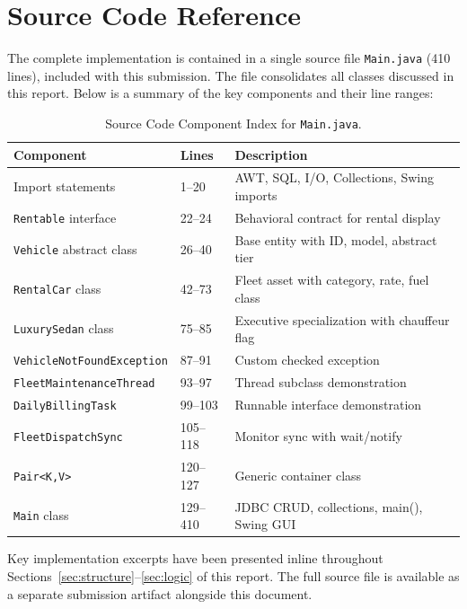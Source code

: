 \documentclass[11pt,a4paper]{article}
\begin{document}
\section{Source Code Reference}
\label{sec:appendix_code}

The complete implementation is contained in a single source file \texttt{Main.java} (410 lines), included with this submission. The file consolidates all classes discussed in this report. Below is a summary of the key components and their line ranges:

\begin{table}[h!]
\centering
\small
\begin{tabularx}{\textwidth}{l l p{6.5cm}}
\toprule
\textbf{Component} & \textbf{Lines} & \textbf{Description} \\
\midrule
Import statements & 1--20 & AWT, SQL, I/O, Collections, Swing imports \\
\texttt{Rentable} interface & 22--24 & Behavioral contract for rental display \\
\texttt{Vehicle} abstract class & 26--40 & Base entity with ID, model, abstract tier \\
\texttt{RentalCar} class & 42--73 & Fleet asset with category, rate, fuel class \\
\texttt{LuxurySedan} class & 75--85 & Executive specialization with chauffeur flag \\
\texttt{VehicleNotFoundException} & 87--91 & Custom checked exception \\
\texttt{FleetMaintenanceThread} & 93--97 & Thread subclass demonstration \\
\texttt{DailyBillingTask} & 99--103 & Runnable interface demonstration \\
\texttt{FleetDispatchSync} & 105--118 & Monitor sync with wait/notify \\
\texttt{Pair<K,V>} & 120--127 & Generic container class \\
\texttt{Main} class & 129--410 & JDBC CRUD, collections, main(), Swing GUI \\
\bottomrule
\end{tabularx}
\caption{Source Code Component Index for \texttt{Main.java}.}
\label{tab:code_index}
\end{table}

Key implementation excerpts have been presented inline throughout Sections~\ref{sec:structure}--\ref{sec:logic} of this report. The full source file is available as a separate submission artifact alongside this document.
\end{document}
